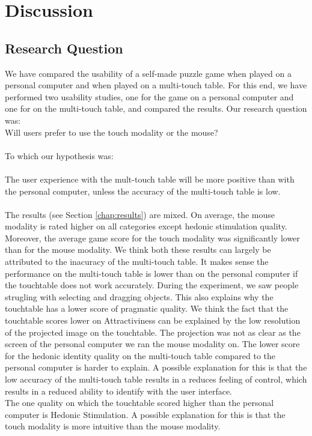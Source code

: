 \documentclass[a4paper,10pt]{report}
\begin{document}
\chapter{Discussion}
\label{chap:discussion}

\section{Research Question}
We have compared the usability of a self-made puzzle game when played on a personal computer and when played on a multi-touch table. For this end, we have performed two usability studies, one for the game on a personal computer and one for on the multi-touch table, and compared the results. Our research question was:\\Will users prefer to use the touch modality or the mouse? \\ \\To which our hypothesis was: \\ \\The user experience with the mult-touch table will be more positive than with the personal computer, unless the accuracy of the multi-touch table is low. \\\\ The results (see Section \ref{chap:results}) are mixed. On average, the mouse modality is rated higher on all categories except hedonic stimulation quality. Moreover, the average game score for the touch modality was significantly lower than for the mouse modality. We think both these results can largely be attributed to the inacuracy of the multi-touch table. It makes sense the performance on the multi-touch table is lower than on the personal computer if the touchtable does not work accurately. During the experiment, we saw people strugling with selecting and dragging objects. This also explains why the touchtable has a lower score of pragmatic quality. We think the fact that the touchtable scores lower on Attractiviness can be explained by the low resolution of the projected image on the touchtable. The projection was not as clear as the screen of the personal computer we ran the mouse modality on. The lower score for the hedonic identity quality on the multi-touch table compared to the personal computer is harder to explain. A possible explanation for this is that the low accuracy of the multi-touch table results in a reduces feeling of control, which results in a reduced ability to identify with the user interface. \\ The one quality on which the touchtable scored higher than the personal computer is Hedonic Stimulation. A possible explanation for this is that the touch modality is more intuitive than the mouse modality. \\ 
\end{document}
